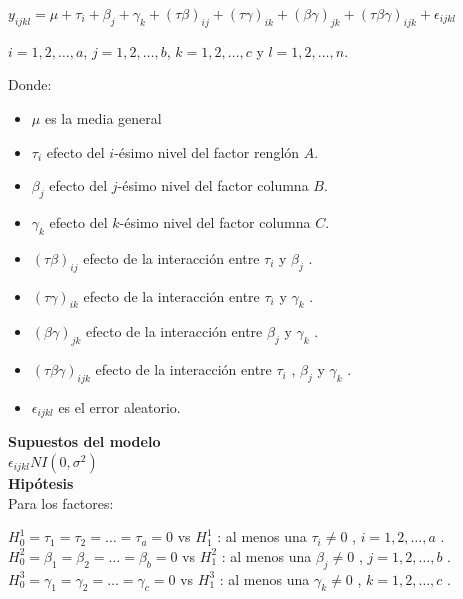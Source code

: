 \begin{center}
	$y_{ijkl}=\mu + \tau_{i} + \beta_{j} + \gamma_{k} + (\tau \beta)_{ij} +(\tau \gamma)_{ik} + (\beta \gamma)_{jk} + (\tau \beta \gamma)_{ijk} + \epsilon_{ijkl} $

	$i = 1,2, \dots, a$, $j = 1,2, \dots, b$, $k = 1,2, \dots, c$  y $l = 1,2, \dots, n$.
 \end{center}
 
Donde:
\begin{itemize}
	\item $\mu$ es la media general
	\item $\tau_{i}$ efecto del $i$-ésimo nivel del factor renglón $A$.
	\item $\beta_{j}$ efecto del $j$-ésimo nivel del factor columna $B$.
	\item $\gamma_{k} $ efecto del $k$-ésimo nivel del factor columna $C$.
	\item $(\tau \beta)_{ij} $ efecto de la interacción entre $\tau_{i}$  y  $\beta_{j}$ .
	\item $(\tau \gamma)_{ik}$ efecto de la interacción entre  $\tau_{i}$  y  $\gamma_{k}$ .
	\item $(\beta \gamma)_{jk}$ efecto de la interacción entre $\beta_{j}$ y  $\gamma_{k}$ .
	\item $(\tau \beta \gamma)_{ijk}$ efecto de la interacción entre $\tau_{i}$  , $\beta_{j}$ y $\gamma_{k}$ .
	\item $\epsilon_{ijkl}$ es el error aleatorio.
\end{itemize}


\textbf{Supuestos del modelo}\\

 $\epsilon_{ijkl} NI (0, \sigma^{2})$\\

\textbf{Hipótesis}\\

Para los factores:
\begin{center}
	$H^{1}_{0} =\tau_{1} = \tau_{2} = \dots = \tau_{a} = 0$ vs $H^{1}_{1}$ : al menos una $\tau_{i} \neq 0$ , $i = 1,2, \dots, a$ .\\
	$H^{2}_{0} =\beta_{1} = \beta_{2} = \dots = \beta_{b} = 0 $ vs $H^{2}_{1}$ : al menos una $\beta_{j} \neq 0$ , $j = 1,2, \dots,b$ .\\
	$H^{3}_{0} =\gamma_{1} = \gamma_{2} = \dots = \gamma_{c} = 0 $ vs $H^{3}_{1}$ : al menos una $\gamma_{k} \neq 0$ , $k = 1,2, \dots,c$ .\\
\end{center}

